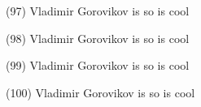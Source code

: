 \documentclass{article}%
\begin{document}
\newline%
\begin{minipage}{0.3333333333333333\textwidth}%
(97) Vladimir Gorovikov%
\newline%
%
is so%
\newline%
%
is cool%
\newline%
%
\end{minipage}%
\begin{minipage}{0.3333333333333333\textwidth}%
(98) Vladimir Gorovikov%
\newline%
%
is so%
\newline%
%
is cool%
\newline%
%
\end{minipage}%
\begin{minipage}{0.3333333333333333\textwidth}%
(99) Vladimir Gorovikov%
\newline%
%
is so%
\newline%
%
is cool%
\newline%
%
\end{minipage}%
\newline%
\begin{minipage}{0.3333333333333333\textwidth}%
(100) Vladimir Gorovikov%
\newline%
%
is so%
\newline%
%
is cool%
\newline%
%
\end{minipage}%
\end{document}
